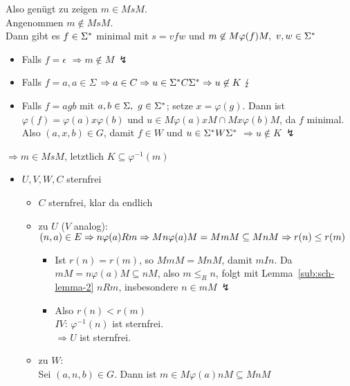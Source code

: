 \begin{itemize}
\begin{itemize}
            Also genügt zu zeigen $m\in MsM$.\\
            Angenommen $m\not\in MsM$.\\
            Dann gibt es $f\in\Sigma^*$ minimal mit $s=vfw$ und $m\not\in M\varphi(f)M,\ v,w\in\Sigmas$
            \begin{itemize}
                \item Falls $f=\epsilon$ $\Rightarrow m\not\in M\ \lightning$
                \item Falls $f=a,a\in \Sigma$ $\Rightarrow a\in C\Rightarrow u\in\Sigma^* C\Sigma^*\Rightarrow u\not\in K\ \lightning$
                \item Falls $f=agb$ mit $a,b\in\Sigma,\ g\in\Sigma^*$; setze $x=\varphi(g)$. Dann ist $\varphi(f)=\varphi(a)x\varphi(b)$ und $u\in M\varphi(a)xM\cap Mx\varphi(b)M$, da $f$ minimal. Also $(a,x,b)\in G$, damit $f\in W$ und $u \in\Sigma^* W\Sigma^*$ $\Rightarrow u\not\in K\ \lightning$
            \end{itemize}
            $\Rightarrow m\in MsM$, letztlich $K\subseteq \varphi^{-1}(m)$
        \end{itemize}
        \begin{itemize}
            \item $U,V,W,C$ sternfrei
            \begin{itemize}
                \item $C$ sternfrei, klar da endlich
                \item zu $U$ ($V$ analog):\\
                    $(n,a)\in E\Rightarrow n\varphi(a)Rm \Rightarrow Mn\varphi(a)M=MmM\subseteq MnM\\\Rightarrow r(n)\le r(m)$
                    \begin{itemize}
                        \item Ist $r(n)=r(m)$, so $MmM=MnM$, damit $mIn$. Da $mM=n\varphi(a)M\subseteq nM$, also $m\le_R n$, folgt mit Lemma~\ref{sub:sch-lemma-2} $nRm$, insbesondere $n\in mM\ \lightning$
                        \item Also $r(n)<r(m)$\\
                        $IV$: $\varphi^{-1}(n)$ ist sternfrei.\\
                        $\Rightarrow U$ ist sternfrei.
                    \end{itemize}
                \item zu $W$:\\
                    Sei $(a,n,b)\in G$. Dann ist $m\in M\varphi(a)nM\subseteq MnM$\\

\end{itemize}
\end{itemize}
\end{itemize}
